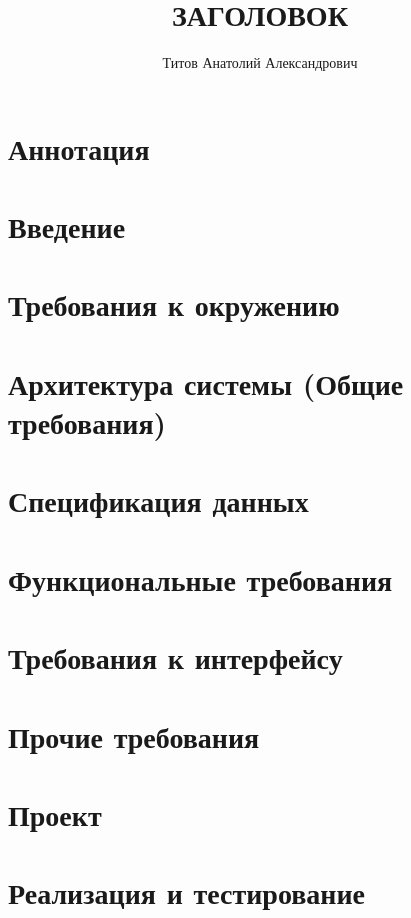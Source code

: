 \documentclass{fefu}
\author{Титов Анатолий Александрович}
\title{ЗАГОЛОВОК}
\newif\ifpractice
\begin{document}
\ifpractice
    \tableofcontents
    \section*{Аннотация}
    
    \newpage
    \section{Введение}
    
    \newpage
    \section{Требования к окружению}
    
    \newpage
    \section{Архитектура системы (Общие требования)}
    
    \newpage
    \section{Спецификация данных}
    
    \newpage
    \section{Функциональные требования}
    
    \newpage
    \section{Требования к интерфейсу}
    
    \newpage
    \section{Прочие требования}
    
    \newpage
    \section{Проект}
    
    \newpage
    \section{Реализация и тестирование}
    
    \newpage
\end{document}
